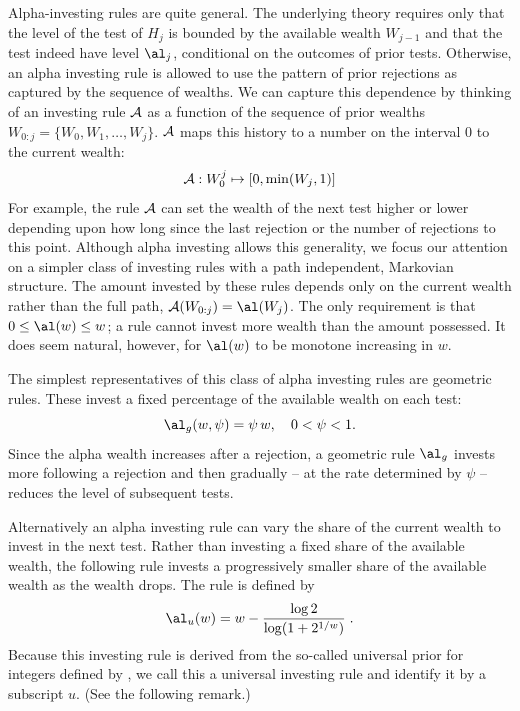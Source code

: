 \documentclass[12pt]{article}
\begin{document}
 
 Alpha-investing rules are quite general.  The underlying theory requires only
 that the level of the test of $H_j$ is bounded by the available wealth
 $W_{j-1}$ and that the test indeed have level $\al_j$, conditional on the
 outcomes of prior tests.  Otherwise, an alpha investing rule is allowed to use
 the pattern of prior rejections as captured by the sequence of wealths.  We can
 capture this dependence by thinking of an investing rule ${\cal A}$ as a
 function of the sequence of prior wealths $W_{0:j} = \{W_0, W_1, \ldots,
 W_j\}$.  $\cal A$ maps this history to a number on the interval 0 to the
 current wealth:
 \begin{equation}
    {\cal A}: W_0^j \mapsto [0, \min(W_j,1)]    
 \label{eq:A}
 \end{equation}
 For example, the rule $\cal A$ can set the wealth of the next test higher or
 lower depending upon how long since the last rejection or the number of
 rejections to this point.  Although alpha investing allows this generality, we
 focus our attention on a simpler class of investing rules with a path
 independent, Markovian structure.  The amount invested by these rules depends
 only on the current wealth rather than the full path, ${\cal A}(W_{0:j}) =
 \al(W_j)$.  The only requirement is that $0 \le \al(w) \le w$; a rule cannot
 invest more wealth than the amount possessed.  It does seem natural, however,
 for $\al(w)$ to be monotone increasing in $w$.


 The simplest representatives of this class of alpha investing rules are
 geometric rules.  These invest a fixed percentage of the available wealth on
 each test:
 \begin{equation}
    \al_g(w, \psi) = \psi \, w, \quad  0 < \psi < 1.
 \label{eq:Ageo}
 \end{equation}
 Since the alpha wealth increases after a rejection, a geometric rule $\al_g$
 invests more following a rejection and then gradually -- at the rate determined
 by $\psi$ -- reduces the level of subsequent tests.


 Alternatively an alpha investing rule can vary the share of the current wealth
 to invest in the next test.  Rather than investing a fixed share of the
 available wealth, the following rule invests a progressively smaller share of
 the available wealth as the wealth drops.  The rule is defined by
 \begin{equation}
   \al_u(w) = w - \frac{\log 2}{\log(1+2^{1/w})} \;.   
 \label{eq:Auniv}
 \end{equation}
 Because this investing rule is derived from the so-called universal prior for
 integers defined by \citet{rissanen83}, we call this a universal investing rule
 and identify it by a subscript $u$.  (See the following remark.) 
\end{document}
